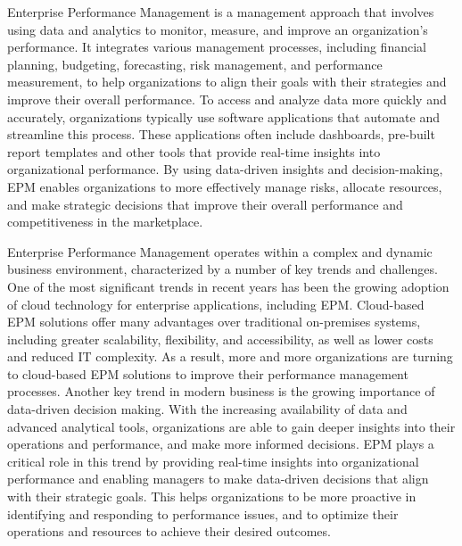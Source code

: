 \documentclass[12pt,a4paper,openright,twoside]{book}
\begin{document}
Enterprise Performance Management is a management approach that involves using data and analytics to monitor, measure, and improve an organization's performance. 
%
It integrates various management processes, including financial planning, budgeting, forecasting, risk management, and performance measurement, to help organizations to align their goals with their strategies and improve their overall performance.
%
To access and analyze data more quickly and accurately, organizations typically use software applications that automate and streamline this process.
%
These applications often include dashboards, pre-built report templates and other tools that provide real-time insights into organizational performance.
%
By using data-driven insights and decision-making, EPM enables organizations to more effectively manage risks, allocate resources, and make strategic decisions that improve their overall performance and competitiveness in the marketplace.

Enterprise Performance Management operates within a complex and dynamic business environment, characterized by a number of key trends and challenges. 
%
One of the most significant trends in recent years has been the growing adoption of cloud technology for enterprise applications, including EPM. 
%
Cloud-based EPM solutions offer many advantages over traditional on-premises systems, including greater scalability, flexibility, and accessibility, as well as lower costs and reduced IT complexity. 
%
As a result, more and more organizations are turning to cloud-based EPM solutions to improve their performance management processes.
%
Another key trend in modern business is the growing importance of data-driven decision making. 
%
With the increasing availability of data and advanced analytical tools, organizations are able to gain deeper insights into their operations and performance, and make more informed decisions. 
%
EPM plays a critical role in this trend by providing real-time insights into organizational performance and enabling managers to make data-driven decisions that align with their strategic goals. 
%
This helps organizations to be more proactive in identifying and responding to performance issues, and to optimize their operations and resources to achieve their desired outcomes.
\end{document}
